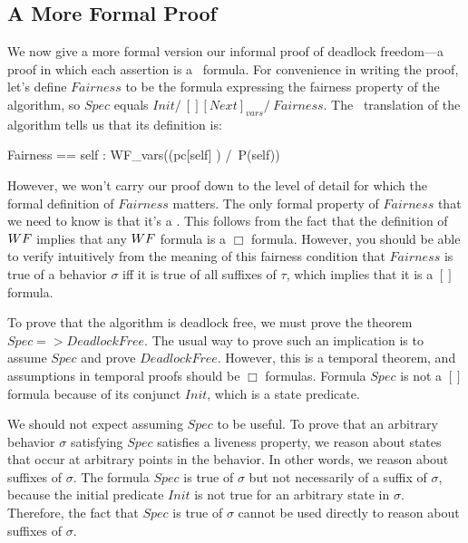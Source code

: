 \documentclass[fleqn,leqno]{article}
\begin{document}
\subsection{A More Formal Proof}

We now give a more formal version our informal proof of deadlock
freedom---a proof in which each assertion is a \tlaplus\ formula.  For
convenience in writing the proof, let's define $Fairness$ to be the
formula expressing the fairness property of the algorithm, so $Spec$
equals
  $Init /\ [][Next]_{vars} /\ Fairness$.  
The \tlaplus\ translation of the algorithm tells us
that its definition is:
\begin{widedisplay}
\begin{notla}
Fairness == \A self  : WF_vars((pc[self] ) /\ P(self))
\end{notla}
\begin{tlatex}
\end{tlatex}
\end{widedisplay}
However, we won't carry our proof down to the level of detail for
which the formal definition of $Fairness$ matters.  The only formal
property of $Fairness$ that we need to know is that it's a
.  This follows from the fact
that the definition of $\WF$ implies that any $\WF$ formula is a
$\Box$ formula.  However, you should be able to verify intuitively
from the meaning of this fairness condition that $Fairness$ is true of
a behavior $\sigma$ iff it is true of all suffixes of $\tau$, which
implies that it is a $[]$ formula.

To prove that the algorithm is deadlock free, we must prove the
theorem $Spec => DeadlockFree$.  The usual way to prove such an
implication is to assume $Spec$ and prove $DeadlockFree$.  However,
this is a temporal theorem, and assumptions in temporal proofs should
be {$\Box$ formulas}.  Formula $Spec$ is not a
$[]$ formula because of its conjunct $Init$, which is a state predicate.

We should not expect assuming $Spec$ to be useful.  To prove that an
arbitrary behavior $\sigma$ satisfying $Spec$ satisfies a liveness
property, we reason about states that occur at arbitrary points in the
behavior.  In other words, we reason about suffixes of $\sigma$.  The
formula $Spec$ is true of $\sigma$ but not necessarily of a suffix of
$\sigma$, because the initial predicate $Init$ is not true for an
arbitrary state in $\sigma$.  Therefore, the fact that $Spec$ is true
of $\sigma$ cannot be used directly to reason about suffixes of
$\sigma$.
\end{document}

